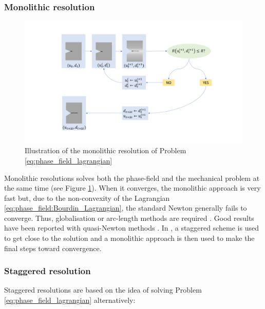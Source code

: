 \subsubsection{Monolithic resolution}

\begin{figure}[H]
  \centering
  \includegraphics[width=10.cm]{../chapter_001_literature_review/figures/monolithic-resolution.pdf}
  \caption{Illustration of the monolithic resolution of Problem \eqref{eq:phase_field_lagrangian}}
  \label{fig:hho:phase_field:monolithic_scheme}
\end{figure}


Monolithic resolutions solves both the phase-field and the mechanical
problem at the same time (see Figure
\ref{fig:hho:phase_field:monolithic_scheme}). When it converges, the
monolithic approach is very fast but, due to the non-convexity of the
Lagrangian \eqref{eq:phase_field:Bourdin_Lagrangian}, the standard Newton
generally fails to converge. Thus, globalisation or arc-length methods
are required \cite{wick_modified_2017, edf_modelisation_2019}. Good results
have been reported with quasi-Newton methods
\cite{wu_bfgs_2020, wu_comprehensive_2020}. In \cite{farrell_linear_2017}, a
staggered scheme is used to get close to the solution and a monolithic
approach is then used to make the final steps toward convergence.

\subsubsection{Staggered resolution}
\label{sec:phase_field:staggered_resolution}

Staggered resolutions are based on the idea of solving Problem
\eqref{eq:phase_field_lagrangian} alternatively:

